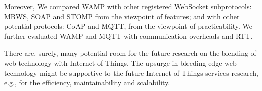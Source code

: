 Moreover, We compared WAMP with other registered WebSocket subprotocols: MBWS, SOAP and STOMP from the viewpoint of features; and with other potential protocols: CoAP and MQTT, from the viewpoint of practicability. We further evaluated WAMP and MQTT with communication overheads and RTT. 

There are, surely, many potential room for the future research on the blending of web technology with Internet of Things. The upsurge in bleeding-edge web technology might be supportive to the future Internet of Things services research, e.g., for the efficiency, maintainability and scalability. 